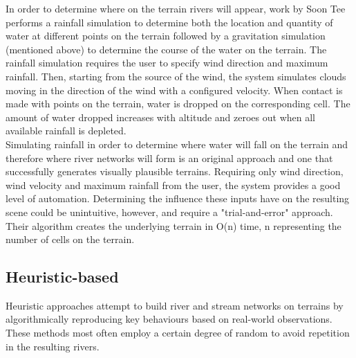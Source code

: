 In order to determine where on the terrain rivers will appear, work by Soon Tee \cite{Teoh2008} performs a rainfall simulation to determine both the location and quantity of water at different points on the terrain followed by a gravitation simulation (mentioned above) to determine the course of the water on the terrain. The rainfall simulation requires the user to specify wind direction and maximum rainfall. Then, starting from the source of the wind, the system simulates clouds moving in the direction of the wind with a configured velocity. When contact is made with points on the terrain, water is dropped on the corresponding cell. The amount of water dropped increases with altitude and zeroes out when all available rainfall is depleted. \\

Simulating rainfall in order to determine where water will fall on the terrain and therefore where river networks will form is an original approach and one that successfully generates visually plausible terrains. Requiring only wind direction, wind velocity and maximum rainfall from the user, the system provides a good level of automation. Determining the influence these inputs have on the resulting scene could be unintuitive, however, and require a "trial-and-error" approach. Their algorithm creates the underlying terrain in O(n) time, n representing the number of cells on the terrain.

\subsection{Heuristic-based}

Heuristic approaches attempt to build river and stream networks on terrains by algorithmically reproducing key behaviours based on real-world observations. These methods most often employ a certain degree of random to avoid repetition in the resulting rivers. \\

